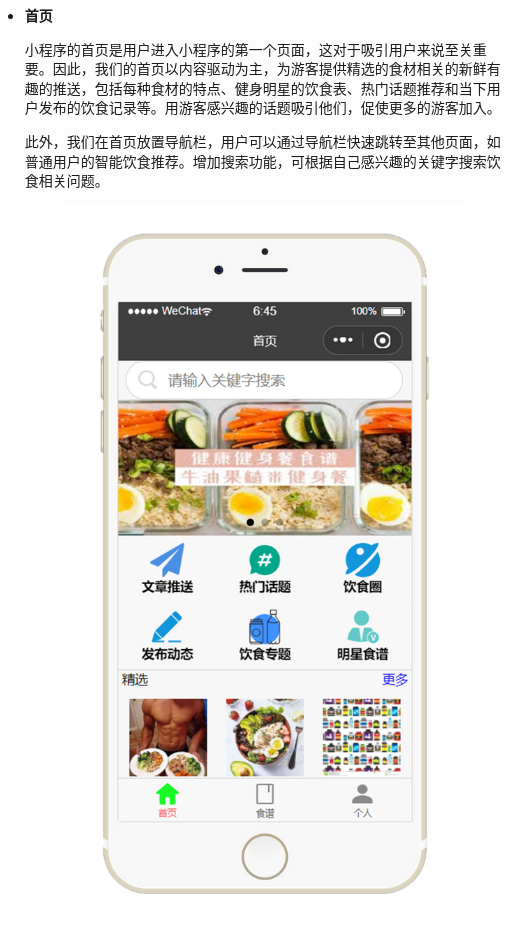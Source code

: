 \documentclass[UTF8,12pt]{ctexart}
\numberwithin{figure}{section}%
\begin{document}
\begin{spacing}{2}
\begin{itemize}
	\newpage
	
	\item\textbf{首页} 
	
	
	\setlength{\parindent}{2em}小程序的首页是用户进入小程序的第一个页面，这对于吸引用户来说至关重要。因此，我们的首页以内容驱动为主，为游客提供精选的食材相关的新鲜有趣的推送，包括每种食材的特点、健身明星的饮食表、热门话题推荐和当下用户发布的饮食记录等。用游客感兴趣的话题吸引他们，促使更多的游客加入。
	
	\setlength{\parindent}{2em}此外，我们在首页放置导航栏，用户可以通过导航栏快速跳转至其他页面，如普通用户的智能饮食推荐。增加搜索功能，可根据自己感兴趣的关键字搜索饮食相关问题。
	
	\newpage
	
	\begin{figure}[!htb]
		\centering
		\includegraphics[width=11cm]{fig/!1}
	\end{figure}
	

\end{itemize}
\end{spacing}
\end{document}
